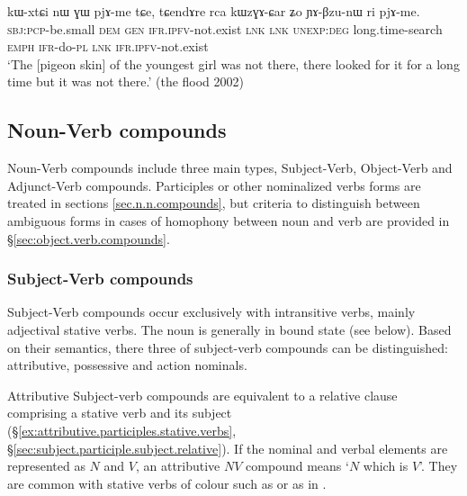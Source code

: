 \begin{exe}
\ex \label{ex:kWZGACar}
\gll kɯ-xtɕi nɯ ɣɯ pjɤ-me tɕe, tɕendɤre rca kɯzɣɤ-ɕar ʑo ɲɤ-βzu-nɯ ri pjɤ-me.\\
\textsc{sbj}:\textsc{pcp}-be.small \textsc{dem} \textsc{gen} \textsc{ifr}.\textsc{ipfv}-not.exist \textsc{lnk} \textsc{lnk} \textsc{unexp}:\textsc{deg} long.time-search \textsc{emph} \textsc{ifr}-do-\textsc{pl} \textsc{lnk} \textsc{ifr}.\textsc{ipfv}-not.exist \\
\glt `The [pigeon skin] of the youngest girl was not there, there looked for it for a long time but it was not there.' (the flood 2002)
\end{exe}

\subsection{Noun-Verb compounds} \label{sec.n.v.compounds}
Noun-Verb compounds include three main types, Subject-Verb, Object-Verb and Adjunct-Verb compounds. Participles or other nominalized verbs forms are treated in sections \ref{sec.n.n.compounds}, but criteria to distinguish between ambiguous forms in cases of homophony between noun and verb are provided in §\ref{sec:object.verb.compounds}.

\subsubsection{Subject-Verb compounds} \label{sec:subject.verb.compounds}
Subject-Verb compounds occur exclusively with intransitive verbs, mainly adjectival stative verbs. The noun is generally in bound state (see  below). Based on their semantics, there three of subject-verb compounds can be distinguished: attributive, possessive and action nominals.

Attributive Subject-verb compounds are equivalent to a relative clause comprising a stative verb and its subject (§\ref{ex:attributive.participles.stative.verbs}, §\ref{sec:subject.participle.subject.relative}). If the nominal and verbal elements are represented as $N$ and $V$, an attributive $NV$ compound means `$N$ which is $V$'. They are common with stative verbs of colour such as  or  as in . 
 
